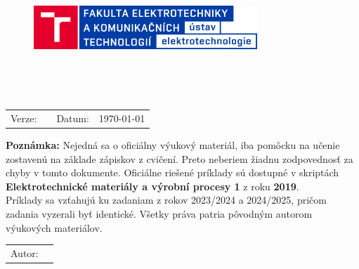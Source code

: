 
\begin{titlepage}

	\begin{center}
		\vspace{-1.5cm}
		
		\begin{figure}[!h]
			\centering
			\includegraphics[width=0.75\textwidth]{images/UETE_Color_RGB_CZ.png}
		\end{figure}
		
		\vspace{4cm}
	
		\LARGE{\textbf{\predmet}}\\
		\vspace{1cm}

		\textbf{\dokument}\\
		\vspace{0.5cm}

		\large\begin{tabular}{llll}
			Verze: & \verze	& Datum: & \today \\
		\end{tabular}
		
		\vfill

		\color{red}\normalsize
		\textbf{Poznámka:} Nejedná sa o oficiálny výukový materiál, iba pomôcku na učenie zostavenú na základe zápiskov z cvičení. Preto neberiem žiadnu zodpovednosť za chyby v tomto dokumente. Oficiálne riešené príklady sú dostupné v skriptách \break \textbf{Elektrotechnické materiály a výrobní procesy 1} z roku \textbf{2019}. \\
		Príklady sa vzťahujú ku zadaniam z rokov 2023/2024 a 2024/2025, pričom zadania vyzerali byť identické. Všetky práva patria pôvodným autorom výukových materiálov.
		\color{black}

		\Large\begin{tabular}{ll}
			Autor:      & \autor     \\
		\end{tabular}
		\hfill
	\end{center}
\end{titlepage}